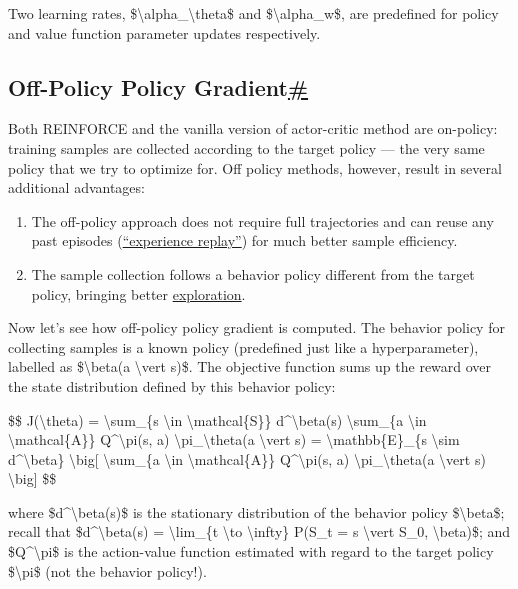 Two learning rates, \$\textbackslash alpha\_\textbackslash theta\$ and \$\textbackslash alpha\_w\$, are predefined for policy and value function parameter updates respectively.

\subsection{\texorpdfstring{Off-Policy Policy Gradient\hyperref[off-policy-policy-gradient]{\#}}{Off-Policy Policy Gradient\#}}\label{off-policy-policy-gradient}

Both REINFORCE and the vanilla version of actor-critic method are on-policy: training samples are collected according to the target policy --- the very same policy that we try to optimize for. Off policy methods, however, result in several additional advantages:

\begin{enumerate}
\tightlist
\item
  The off-policy approach does not require full trajectories and can reuse any past episodes (\href{https://lilianweng.github.io/posts/2018-02-19-rl-overview/\#deep-q-network}{``experience replay''}) for much better sample efficiency.
\item
  The sample collection follows a behavior policy different from the target policy, bringing better \href{https://lilianweng.github.io/posts/2018-02-19-rl-overview/\#exploration-exploitation-dilemma}{exploration}.
\end{enumerate}

Now let's see how off-policy policy gradient is computed. The behavior policy for collecting samples is a known policy (predefined just like a hyperparameter), labelled as \$\textbackslash beta(a \textbackslash vert s)\$. The objective function sums up the reward over the state distribution defined by this behavior policy:

\$\$ J(\textbackslash theta) = \textbackslash sum\_\{s \textbackslash in \textbackslash mathcal\{S\}\} d\^{}\textbackslash beta(s) \textbackslash sum\_\{a \textbackslash in \textbackslash mathcal\{A\}\} Q\^{}\textbackslash pi(s, a) \textbackslash pi\_\textbackslash theta(a \textbackslash vert s) = \textbackslash mathbb\{E\}\_\{s \textbackslash sim d\^{}\textbackslash beta\} \textbackslash big{[} \textbackslash sum\_\{a \textbackslash in \textbackslash mathcal\{A\}\} Q\^{}\textbackslash pi(s, a) \textbackslash pi\_\textbackslash theta(a \textbackslash vert s) \textbackslash big{]} \$\$

where \$d\^{}\textbackslash beta(s)\$ is the stationary distribution of the behavior policy \$\textbackslash beta\$; recall that \$d\^{}\textbackslash beta(s) = \textbackslash lim\_\{t \textbackslash to \textbackslash infty\} P(S\_t = s \textbackslash vert S\_0, \textbackslash beta)\$; and \$Q\^{}\textbackslash pi\$ is the action-value function estimated with regard to the target policy \$\textbackslash pi\$ (not the behavior policy!).

